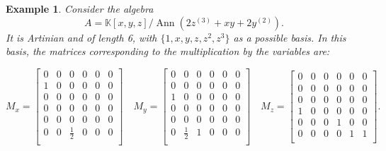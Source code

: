 \documentclass[a4paper,11p]{amsart}
\newtheorem{example0}[defn0]{Example}
\newenvironment{example}{ \begin{example0}\rm}{\end{example0}}
\newcommand{\K}{\mathbb K}
\begin{document}
\begin{example}\label{Example: HF}
    Consider the algebra
    $$A=\K[x,y,z]/\operatorname{Ann}\left(2z^{(3)}+xy+2y^{(2)}\right).$$
    It is Artinian and of length 6, with $\{1,x,y,z,z^2,z^3\}$ as a possible basis. In this basis, the matrices corresponding to the multiplication by the variables are:
{\scriptsize

\[
\textstyle
M_x =
\begin{bmatrix}
0 & 0 & 0 & 0 & 0 & 0 \\
1 & 0 & 0 & 0 & 0 & 0 \\
0 & 0 & 0 & 0 & 0 & 0 \\
0 & 0 & 0 & 0 & 0 & 0 \\
0 & 0 & 0 & 0 & 0 & 0 \\
0 & 0 & \tfrac{1}{2} & 0 & 0 & 0 \\
\end{bmatrix}
\quad
M_y =
\begin{bmatrix}
0 & 0 & 0 & 0 & 0 & 0 \\
0 & 0 & 0 & 0 & 0 & 0 \\
1 & 0 & 0 & 0 & 0 & 0 \\
0 & 0 & 0 & 0 & 0 & 0 \\
0 & 0 & 0 & 0 & 0 & 0 \\
0 & \tfrac{1}{2} & 1 & 0 & 0 & 0 \\
\end{bmatrix}
\quad
M_z =
\begin{bmatrix}
0 & 0 & 0 & 0 & 0 & 0 \\
0 & 0 & 0 & 0 & 0 & 0 \\
0 & 0 & 0 & 0 & 0 & 0 \\
1 & 0 & 0 & 0 & 0 & 0 \\
0 & 0 & 0 & 1 & 0 & 0 \\
0 & 0 & 0 & 0 & 1 & 1 \\
\end{bmatrix}.
\]
}


\end{example}
\end{document}
